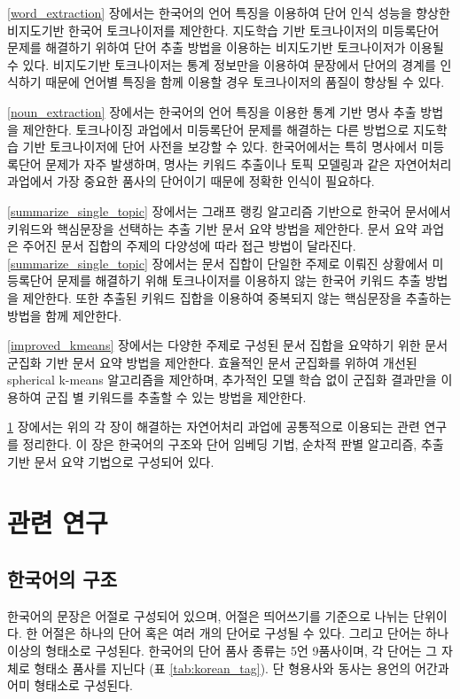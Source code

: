 \documentclass[oneside, ko,phd]{snuthesis_utf8_kor}
\begin{document}
\ref{word_extraction} 장에서는 한국어의 언어 특징을 이용하여 단어 인식 성능을 향상한 비지도기반 한국어 토크나이저를 제안한다.
지도학습 기반 토크나이저의 미등록단어 문제를 해결하기 위하여 단어 추출 방법을 이용하는 비지도기반  토크나이저가 이용될 수 있다.
비지도기반 토크나이저는 통계 정보만을 이용하여 문장에서 단어의 경계를 인식하기 때문에 언어별 특징을 함께 이용할 경우 토크나이저의 품질이 향상될 수 있다.

\ref{noun_extraction} 장에서는 한국어의 언어 특징을 이용한 통계 기반 명사 추출 방법을 제안한다.
토크나이징 과업에서 미등록단어 문제를 해결하는 다른 방법으로 지도학습 기반 토크나이저에 단어 사전을 보강할 수 있다.
한국어에서는 특히 명사에서 미등록단어 문제가 자주 발생하며, 명사는 키워드 추출이나 토픽 모델링과 같은 자연어처리 과업에서 가장 중요한 품사의 단어이기 때문에 정확한 인식이 필요하다.

\ref{summarize_single_topic} 장에서는 그래프 랭킹 알고리즘 기반으로 한국어 문서에서 키워드와 핵심문장을 선택하는 추출 기반 문서 요약 방법을 제안한다.
문서 요약 과업은 주어진 문서 집합의 주제의 다양성에 따라 접근 방법이 달라진다.
\ref{summarize_single_topic} 장에서는 문서 집합이 단일한 주제로 이뤄진 상황에서 미등록단어 문제를 해결하기 위해 토크나이저를 이용하지 않는 한국어 키워드 추출 방법을 제안한다.
또한 추출된 키워드 집합을 이용하여 중복되지 않는 핵심문장을 추출하는 방법을 함께 제안한다.

\ref{improved_kmeans} 장에서는 다양한 주제로 구성된 문서 집합을 요약하기 위한 문서 군집화 기반 문서 요약 방법을 제안한다.
효율적인 문서 군집화를 위하여 개선된 spherical k-means 알고리즘을 제안하며, 추가적인 모델 학습 없이 군집화 결과만을 이용하여 군집 별 키워드를 추출할 수 있는 방법을 제안한다.

\ref{related_works} 장에서는 위의 각 장이 해결하는 자연어처리 과업에 공통적으로 이용되는 관련 연구를 정리한다.
이 장은 한국어의 구조와 단어 임베딩 기법, 순차적 판별 알고리즘, 추출 기반 문서 요약 기법으로 구성되어 있다.

 
\newpage
\chapter{관련 연구} \label{related_works}

\section{한국어의 구조}

한국어의 문장은 어절로 구성되어 있으며, 어절은 띄어쓰기를 기준으로 나뉘는 단위이다.
한 어절은 하나의 단어 혹은 여러 개의 단어로 구성될 수 있다.
그리고 단어는 하나 이상의 형태소로 구성된다.
한국어의 단어 품사 종류는 5언 9품사이며, 각 단어는 그 자체로 형태소 품사를 지닌다 (표 \ref{tab:korean_tag}).
단 형용사와 동사는 용언의 어간과 어미 형태소로 구성된다.
\end{document}
